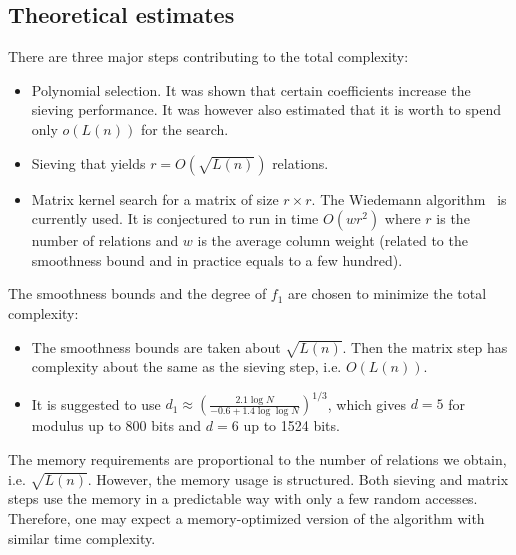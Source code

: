 \documentclass[a4paper]{article}
\begin{document}
\subsection{Theoretical estimates}
There are three major steps contributing to the total complexity:
\begin{itemize}
    \item Polynomial selection. It was shown that certain coefficients increase the sieving performance. It was however also estimated that it is worth to spend only $o(L(n))$ for the search.
    \item Sieving that yields $r=O(\sqrt{L(n)})$ relations. 
    \item Matrix kernel search for a matrix of size $r\times r$. The Wiedemann algorithm~\cite{DBLP:journals/tit/Wiedemann86} is currently used. It is conjectured to run in time $O(wr^2)$ where $r$ is the number of relations and $w$ is the average column weight (related to the smoothness bound and in practice equals to a few hundred).
\end{itemize}
The smoothness bounds and the degree of $f_1$ are chosen to minimize the total complexity:
\begin{itemize}
    \item The smoothness bounds are taken about $\sqrt{L(n)}$. Then the matrix step has complexity about the same as the sieving step, i.e. $O(L(n))$.
    \item It is suggested to use 
$d_1 \approx \left(\frac{2.1\log N}{-0.6+1.4\log \log N }\right)^{1/3}$, which gives $d=5$ for modulus up to 800 bits and $d=6$ up to 1524 bits. 
\end{itemize}


The memory requirements are proportional to the number of relations we obtain, i.e. $\sqrt{L(n)}$. However, the memory usage is structured. Both sieving and matrix steps use the memory in a predictable way with only a few random accesses. Therefore, one may expect a memory-optimized version of the algorithm with similar time complexity.
\end{document}
